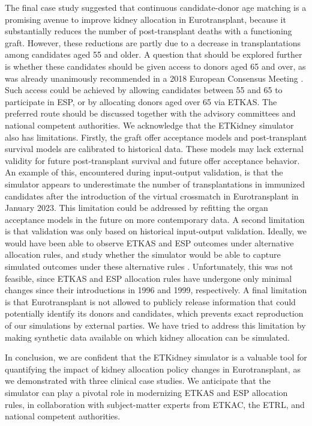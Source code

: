 \documentclass[11pt,twoside,]{book}
\begin{document}
The final case study suggested that continuous candidate-donor age matching is
a promising avenue to improve kidney allocation in Eurotransplant, because it
substantially reduces the number of post-transplant deaths with a functioning
graft. However, these reductions are partly due to a decrease in transplantations
among candidates aged 55 and older. A question that
should be explored further is whether these candidates should be given access
to donors aged 65 and over, as was already unanimously recommended in a 2018 European
Consensus Meeting \citep{Ssal2020}. Such access could be achieved by allowing
candidates between 55 and 65 to participate in ESP, or by allocating
donors aged over 65 via ETKAS. The preferred route should be discussed together
with the advisory committees and national competent authorities.
\newpage
We acknowledge that the ETKidney simulator also has limitations.
Firstly, the graft offer acceptance models and post-transplant survival models
are calibrated to historical data. These models may lack external
validity for future post-transplant survival and future offer acceptance
behavior. An example of this, encountered during input-output
validation, is that the simulator appears to underestimate the number of
transplantations in immunized candidates after the introduction of the virtual
crossmatch in Eurotransplant in January 2023. This limitation could be addressed
by refitting the organ acceptance models in the future on more
contemporary data. A second limitation is that validation was only based on
historical input-output validation. Ideally, we would have been able to
observe ETKAS and ESP outcomes under alternative allocation
rules, and study whether the simulator would be able to capture
simulated outcomes under these alternative rules \citep{sargent2020}.
Unfortunately, this was not feasible, since ETKAS and ESP allocation rules
have undergone only minimal changes since their introductions in 1996 and 1999,
respectively. A final limitation is that Eurotransplant is not allowed
to publicly release information that could potentially identify its
donors and candidates, which prevents exact reproduction of our simulations by external parties. We have tried to address this
limitation by making synthetic data available on which kidney
allocation can be simulated.

In conclusion, we are confident that the ETKidney simulator is a valuable tool
for quantifying the impact of kidney allocation policy changes in
Eurotransplant, as we demonstrated with three clinical case studies. We
anticipate that the simulator can play a pivotal role in modernizing
ETKAS and ESP allocation rules, in collaboration with subject-matter
experts from ETKAC, the ETRL, and national competent authorities.
\end{document}
